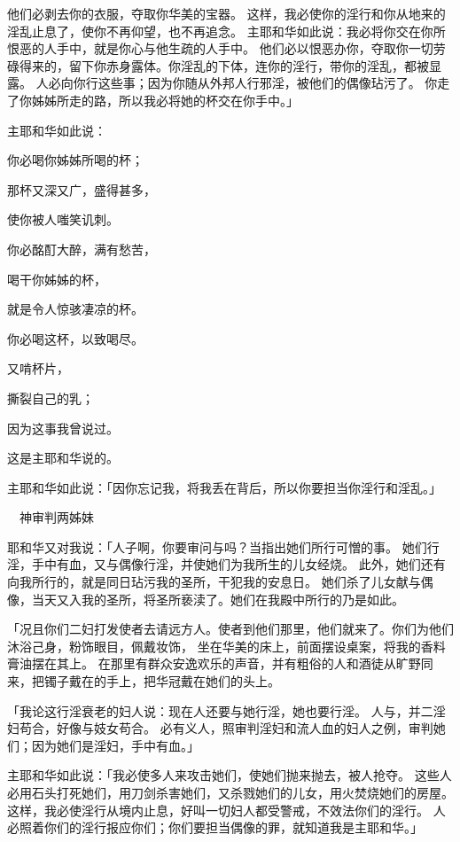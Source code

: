 {他们必剥去你的衣服，夺取你华美的宝器。
这样，我必使你的淫行和你从{}地{}来的淫乱止息了，使你不再仰望{}，也不再追念{}。
主耶和华如此说：我必将你交在你所恨恶的人手中，就是你心与他生疏的人手中。
他们必以恨恶办你，夺取你一切劳碌得来的，留下你赤身露体。你淫乱的下体，连你的淫行，带你的淫乱，都被显露。
人必向你行这些事；因为你随从外邦人行邪淫，被他们的偶像玷污了。
你走了你姊姊所走的路，所以我必将她的杯交在你手中。」
\par }{\Q {}主耶和华如此说：
\par }{\Q 你必喝你姊姊所喝的杯；
\par }{\Q 那杯又深又广，盛得甚多，
\par }{\Q 使你被人嗤笑讥刺。
\par }{\Q {}你必酩酊大醉，满有愁苦，
\par }{\Q 喝干你姊姊{}的杯，
\par }{\Q 就是令人惊骇凄凉的杯。
\par }{\Q {}你必喝这杯，以致喝尽。
\par }{又啃杯片，
\par }{\Q 撕裂自己的乳；
\par }{\Q 因为这事我曾说过。
\par }{\Q 这是主耶和华说的。
\par }{\PP {}主耶和华如此说：「因你忘记我，将我丢在背后，所以你要担当你淫行和淫乱{}。」
\par }{\SH 　神审判两姊妹
\par }{\PP {}耶和华又对我说：「人子啊，你要审问{}与{}吗？当指出她们所行可憎的事。
她们行淫，手中有{}血，又与偶像行淫，并使她们为我所生的儿女经{}烧{}。
此外，她们还有向我所行的，就是同日玷污我的圣所，干犯我的安息日。
她们杀了儿女献与偶像，当天又入我的圣所，将圣所亵渎了。她们在我殿中所行的乃是如此。
\par }{\PP {}「况且你们二妇打发使者去请远方人。使者到他们那里，他们就来了。你们为他们沐浴己身，粉饰眼目，佩戴妆饰，
坐在华美的床上，前面摆设桌案，将我的香料膏油摆在其上。
在那里有群众安逸欢乐的声音，并有粗俗的人和酒徒从旷野同来，把镯子戴在{}的手上，把华冠戴在她们的头上。
\par }{\PP {}「我论这行淫衰老的妇人说：现在人还要与她行淫，她也要{}行淫。
人与{}，并{}二淫妇苟合，好像与妓女苟合。
必有义人，照审判淫妇和流人血的妇人之例，审判她们；因为她们是淫妇，手中有{}血。」
\par }{\PP {}主耶和华如此说：「我必使多人来攻击她们，使她们抛来抛去，被人抢夺。
这些人必用石头打死她们，用刀剑杀害她们，又杀戮她们的儿女，用火焚烧她们的房屋。
这样，我必使淫行从境内止息，好叫一切妇人都受警戒，不效法你们的淫行。
人必照着你们的淫行报应你们；你们要担当{}偶像的罪，就知道我是主耶和华。」

}
